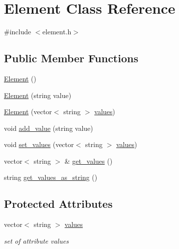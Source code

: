 \hypertarget{classElement}{}\section{Element Class Reference}
\label{classElement}


{\ttfamily \#include $<$element.\+h$>$}

\subsection*{Public Member Functions}
\begin{DoxyCompactItemize}
\item 
\hyperlink{classElement_ab0d0e20be9a36ae676202db753faeec9}{Element} ()
\item 
\hyperlink{classElement_ac5749aba608dc8bfb68c7e996d159cb7}{Element} (string value)
\item 
\hyperlink{classElement_a628516fcaf54458e35ffbcb3a9082e99}{Element} (vector$<$ string $>$ \hyperlink{classElement_ae2b88bc22f391bc263521096c2613897}{values})
\item 
void \hyperlink{classElement_a67439f02d44fb2fa834d9a7b223709a8}{add\+\_\+value} (string value)
\item 
void \hyperlink{classElement_aa962031ba982f58e7bd5caceb5b8d058}{set\+\_\+values} (vector$<$ string $>$ \hyperlink{classElement_ae2b88bc22f391bc263521096c2613897}{values})
\item 
vector$<$ string $>$ \& \hyperlink{classElement_ae1c0e14049aaa6b7a9c047039038de3a}{get\+\_\+values} ()
\item 
string \hyperlink{classElement_a50b58de922a1cb1ee1dea8abf789bb64}{get\+\_\+values\+\_\+as\+\_\+string} ()
\end{DoxyCompactItemize}
\subsection*{Protected Attributes}
\begin{DoxyCompactItemize}
\item 
\mbox{\label{classElement_ae2b88bc22f391bc263521096c2613897}} 
vector$<$ string $>$ \hyperlink{classElement_ae2b88bc22f391bc263521096c2613897}{values}
\begin{DoxyCompactList}\small\item\em set of attribute values \end{DoxyCompactList}\end{DoxyCompactItemize}


